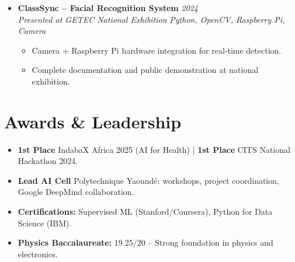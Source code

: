 \documentclass[a4paper,11pt]{article}
\begin{document}
\begin{itemize}[leftmargin=*, label={-}]
\item \textbf{ClassSync -- Facial Recognition System} \hfill \textit{2024} \\
\textit{Presented at GETEC National Exhibition} \hfill \textit{Python, OpenCV, Raspberry Pi, Camera}
\vspace{-2pt}
    \begin{itemize}[leftmargin=0.4cm, nosep, label=\tiny$\bullet$]
        \item \small{Camera + Raspberry Pi hardware integration for real-time detection.}
        \item \small{Complete documentation and public demonstration at national exhibition.}
    \end{itemize}
\vspace{3pt}

\end{itemize}

\section{Awards \& Leadership}
\begin{itemize}[leftmargin=*, label=\tiny$\bullet$, nosep]
    \item \small{\textbf{1st Place} IndabaX Africa 2025 (AI for Health) | \textbf{1st Place} CITS National Hackathon 2024.}
    \item \small{\textbf{Lead AI Cell} Polytechnique Yaoundé: workshops, project coordination, Google DeepMind collaboration.}
    \item \small{\textbf{Certifications:} Supervised ML (Stanford/Coursera), Python for Data Science (IBM).}
    \item \small{\textbf{Physics Baccalaureate:} 19.25/20 -- Strong foundation in physics and electronics.}
\end{itemize}
\end{document}
